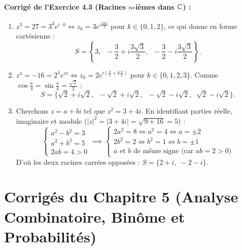 \paragraph{Corrigé de l'Exercice 4.3 (Racines $n$-ièmes dans $\mathbb{C}$) :}
\begin{enumerate}[label=(\alph*)]
    \item $z^3 = 27 = 3^3 e^{i\cdot 0} \iff z_k = 3 e^{i\frac{2k\pi}{3}}$ pour $k \in \{0, 1, 2\}$, ce qui donne en forme cartésienne :
    \[
        \boxed{S = \left\{3,\;\; -\frac{3}{2} + i\frac{3\sqrt{3}}{2},\;\; -\frac{3}{2} - i\frac{3\sqrt{3}}{2}\right\}}.
    \]
    \item $z^4 = -16 = 2^4 e^{i\pi} \iff z_k = 2 e^{i\left(\frac{\pi}{4} + k\frac{\pi}{2}\right)}$ pour $k \in \{0, 1, 2, 3\}$. Comme $\cos\frac{\pi}{4} = \sin\frac{\pi}{4} = \frac{\sqrt{2}}{2}$ :
    \[
        \boxed{S = \bigl\{\sqrt{2} + i\sqrt{2},\;\; -\sqrt{2} + i\sqrt{2},\;\; -\sqrt{2} - i\sqrt{2},\;\; \sqrt{2} - i\sqrt{2}\bigr\}}.
    \]
    \item Cherchons $z = a + bi$ tel que $z^2 = 3 + 4i$. En identifiant parties réelle, imaginaire et module ($|z|^2 = |3+4i| = \sqrt{9+16} = 5$) :
    \[
        \begin{cases} a^2 - b^2 = 3 \\ a^2 + b^2 = 5 \\ 2ab = 4 > 0 \end{cases} \implies \begin{cases} 2a^2 = 8 \iff a^2 = 4 \iff a = \pm 2 \\ 2b^2 = 2 \iff b^2 = 1 \iff b = \pm 1 \\ a \text{ et } b \text{ de même signe (car } ab = 2 > 0\text{)} \end{cases}
    \]
    D'où les deux racines carrées opposées : $\boxed{S = \{2 + i,\; -2 - i\}}$.
\end{enumerate}

\section{Corrigés du Chapitre 5 (Analyse Combinatoire, Binôme et Probabilités)}

